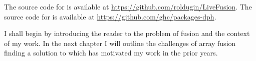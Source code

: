\documentclass[preamble.tex]{subfiles}
\begin{document}
The source code for \LiveFusion is available at \url{https://github.com/roldugin/LiveFusion}. The source code for  is available at \url{https://github.com/ghc/packages-dph}.

I shall begin by introducing the reader to the problem of fusion and the context of my work. In the next chapter I will outline the challenges of array fusion finding a solution to which has motivated my work in the prior years.





\IfNotCompilingAll{\printbibliography}
\end{document}
